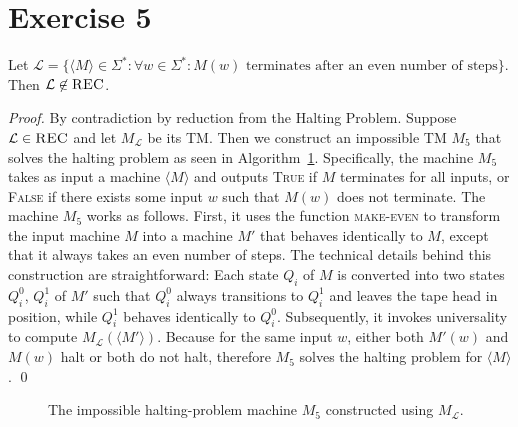 \documentclass[11pt]{llncs}
\begin{document}
\section*{Exercise 5}
\begin{lemma}
Let $\mathcal{L} = \{
    \langle M \rangle \in \Sigma^*:
    \forall w \in \Sigma^*:
    M(w) \text{ terminates after an even number of steps}
\}$. Then $\mathcal{L} \not \in \textsc{REC}$.
\end{lemma}
\begin{proof}
By contradiction by reduction from the Halting Problem. Suppose $\mathcal{L} \in
\textsc{REC}$ and let $M_\mathcal{L}$ be its TM. Then we construct an impossible
TM $M_5$ that solves the halting problem as seen in Algorithm~\ref{alg.ex5}.
Specifically, the machine $M_5$ takes as input a machine $\langle M \rangle$
and outputs \textsc{True} if $M$ terminates for all inputs, or \textsc{False} if
there exists some input $w$ such that $M(w)$ does not terminate.
The machine $M_5$ works as follows. First, it uses the function
\textsc{make-even} to transform the input machine $M$ into a machine $M'$ that
behaves identically to $M$, except that it always takes an even number of steps.
The technical details behind this construction are straightforward: Each state
$Q_i$ of $M$ is converted into two states $Q_i^0$, $Q_i^1$ of $M'$ such that
$Q_i^0$ always transitions to $Q_i^1$ and leaves the tape head in position,
while $Q_i^1$ behaves identically to $Q_i^0$. Subsequently, it invokes
universality to compute $M_\mathcal{L}(\langle M' \rangle)$. Because for the
same input $w$, either both $M'(w)$ and $M(w)$ halt or both do not halt,
therefore $M_5$ solves the halting problem for $\langle M \rangle$. \qed
\end{proof}

\begin{figure}[t]
\begin{algorithm}[H]
  \caption{\label{alg.ex5}
      The impossible halting-problem machine $M_5$
      constructed using $M_\mathcal{L}$.
  }
  \begin{algorithmic}[1]
          \State{}
        \EndIf
        \State{}
      \EndFunction
  \end{algorithmic}
\end{algorithm}
\end{figure}
\end{document}
